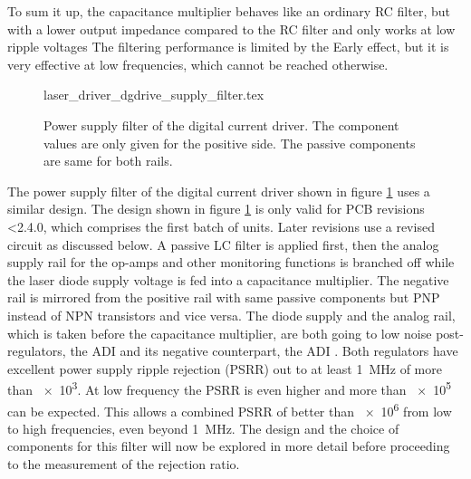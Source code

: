 To sum it up, the capacitance multiplier behaves like an ordinary RC filter, but with a lower output impedance compared to the RC filter and only works at low ripple voltages The filtering performance is limited by the Early effect, but it is very effective at low frequencies, which cannot be reached otherwise.
\begin{figure}[ht]
    \centering
        {laser_driver_dgdrive_supply_filter.tex}
    \caption{Power supply filter of the digital current driver. The component values are only given for the positive side. The passive components are same for both rails.}
    \label{fig:laser_driver_dgdrive_filter}
\end{figure}

The power supply filter of the digital current driver shown in figure \ref{fig:laser_driver_dgdrive_filter} uses a similar design. The design shown in figure \ref{fig:laser_driver_dgdrive_filter} is only valid for PCB revisions <2.4.0, which comprises the first batch of units. Later revisions use a revised circuit as discussed below. A passive LC filter is applied first, then the analog supply rail for the op-amps and other monitoring functions is branched off while the laser diode supply voltage is fed into a capacitance multiplier. The negative rail is mirrored from the positive rail with same passive components but PNP instead of NPN transistors and vice versa. The diode supply and the analog rail, which is taken before the capacitance multiplier, are both going to low noise post-regulators, the ADI  and its negative counterpart, the ADI . Both regulators have excellent power supply ripple rejection (PSRR) out to at least \qty{1}{\MHz} of more than \num{e3}. At low frequency the PSRR is even higher and more than \num{e5} can be expected. This allows a combined PSRR of better than \num{e6} from low to high frequencies, even beyond \qty{1}{\MHz}. The design and the choice of components for this filter will now be explored in more detail before proceeding to the measurement of the rejection ratio.

